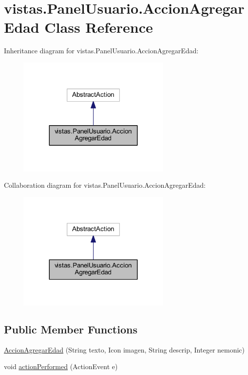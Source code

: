 \hypertarget{classvistas_1_1_panel_usuario_1_1_accion_agregar_edad}{}\section{vistas.\+Panel\+Usuario.\+Accion\+Agregar\+Edad Class Reference}
\label{classvistas_1_1_panel_usuario_1_1_accion_agregar_edad}


Inheritance diagram for vistas.\+Panel\+Usuario.\+Accion\+Agregar\+Edad\+:
\nopagebreak
\begin{figure}[H]
\begin{center}
\leavevmode
\includegraphics[width=215pt]{classvistas_1_1_panel_usuario_1_1_accion_agregar_edad__inherit__graph}
\end{center}
\end{figure}


Collaboration diagram for vistas.\+Panel\+Usuario.\+Accion\+Agregar\+Edad\+:
\nopagebreak
\begin{figure}[H]
\begin{center}
\leavevmode
\includegraphics[width=215pt]{classvistas_1_1_panel_usuario_1_1_accion_agregar_edad__coll__graph}
\end{center}
\end{figure}
\subsection*{Public Member Functions}
\begin{DoxyCompactItemize}
\item 
\mbox{\hyperlink{classvistas_1_1_panel_usuario_1_1_accion_agregar_edad_a3565b9b11f4ffa7ca013a28a1660ff70}{Accion\+Agregar\+Edad}} (String texto, Icon imagen, String descrip, Integer nemonic)
\item 
void \mbox{\hyperlink{classvistas_1_1_panel_usuario_1_1_accion_agregar_edad_ab9cd4d3b054617348763f4ffb3b20a32}{action\+Performed}} (Action\+Event e)
\end{DoxyCompactItemize}


